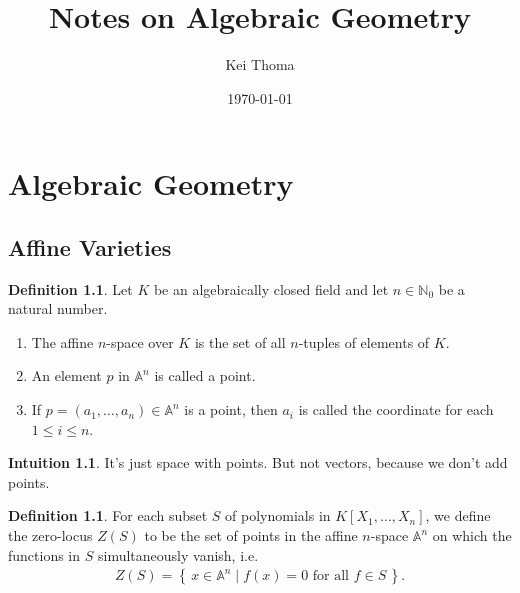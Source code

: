 \documentclass[11pt]{book}
\title{Notes on Algebraic Geometry}
\author{Kei Thoma}
\date{\today}
\theoremstyle{definition}
\newtheorem{definition}[theorem]{Definition}
\newtheorem{intuition}[theorem]{Intuition}
\numberwithin{equation}{section}
\newcommand{\makeset}[2]{\left\{\, #1 \mathrel{\mid} #2 \,\right\}}
\begin{document}
\maketitle
\tableofcontents

\cite{hartshorne1977}
\newpage


\part{Algebraic Geometry}
\chapter{Affine Varieties}
\begin{defbox}
    \begin{definition}
        Let \(K\) be an algebraically closed field and let \(n \in \mathbb{N}_0\) be a natural number.
        \begin{enumerate}
            \item The affine \(n\)-space over \(K\) is the set of all \(n\)-tuples of elements of \(K\).
            \item An element \(p\) in \(\mathbb{A}^n\) is called a point.
            \item If \(p = (a_1, \ldots, a_n) \in \mathbb{A}^n\) is a point, then \(a_i\) is called the coordinate for each \(1 \leq i \leq n\).
        \end{enumerate}
    \end{definition}
\end{defbox}

\begin{intbox}
\begin{intuition}
It's just space with points. But not vectors, because we don't add points.
\end{intuition}
\end{intbox}

\begin{defbox}
    \begin{definition}
        For each subset \(S\) of polynomials in \(K[X_1, \ldots, X_n]\), we define the zero-locus \(Z(S)\) to be the set of points in the affine \(n\)-space \(\mathbb{A}^n\) on which the functions in \(S\) simultaneously vanish, i.e.
        \begin{align*}
            Z(S) = \makeset{x \in \mathbb{A}^n}{f(x) = 0 \text{ for all } f \in S} \text{.}
        \end{align*}
    \end{definition}
\end{defbox}
\end{document}
